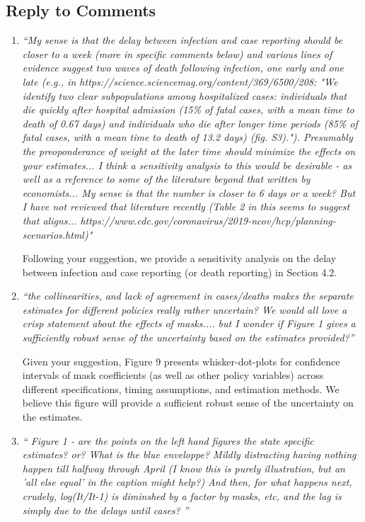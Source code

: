 \documentclass[11pt]{article}
\begin{document}
\subsection*{Reply to Comments}
\begin{enumerate}

\item  \textit{``My sense is that the delay between infection and case reporting should be closer to a week (more in specific comments below) and various lines of evidence suggest two waves of death following infection, one early and one late (e.g., in https://science.sciencemag.org/content/369/6500/208: "We identify two clear subpopulations among hospitalized cases: individuals that die quickly after hospital admission (15\% of fatal cases, with a mean time to death of 0.67 days) and individuals who die after longer time periods (85\% of fatal cases, with a mean time to death of 13.2 days) (fig. S3)."). Presumably the preoponderance of weight at the later time should minimize the effects on your estimates... I think a sensitivity analysis to this would be desirable - as well as a reference to some of the literature beyond that written by economists... My sense is that the number is closer to 6 days or a week? But I have not reviewed that literature recently (Table 2 in this seems to suggest that aligns... https://www.cdc.gov/coronavirus/2019-ncov/hcp/planning-scenarios.html)"}

Following your suggestion,   we provide a sensitivity analysis on the delay between infection and case reporting (or death reporting) in Section 4.2. 

\item \textit{``the collinearities, and lack of agreement in cases/deaths makes the separate estimates for different policies really rather uncertain? We would all love a crisp statement about the effects of masks.... but I wonder if Figure 1 gives a sufficiently robust sense of the uncertainty  based on the estimates provided?''}
 
Given  your suggestion, Figure 9 presents whisker-dot-plots for confidence intervals of mask coefficients (as well as other policy variables) across different specifications, timing assumptions, and estimation methods. We believe this figure will provide a sufficient robust sense of the uncertainty on the  estimates. 
  
\item \textit{`` Figure 1 - are the points on the left hand figures the state specific estimates? or? What is the blue enveloppe? Mildly distracting having nothing happen till halfway through April (I know this is purely illustration, but an 'all else equal' in the caption might help?) And then, for what happens next, crudely, log(It/It-1) is diminshed by a factor by masks, etc, and the lag is simply due to the delays until cases? ''}
 

\end{enumerate}
\end{document}
